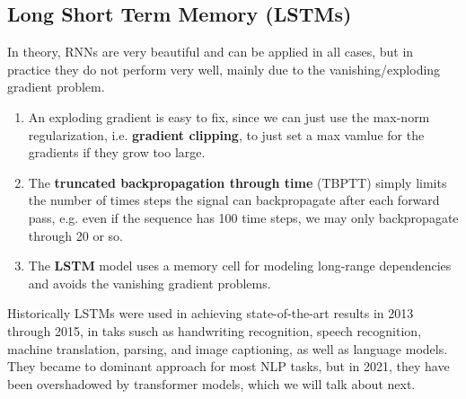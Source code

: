 \documentclass{article}
\begin{document}
  \subsection{Long Short Term Memory (LSTMs)}

    In theory, RNNs are very beautiful and can be applied in all cases, but in practice they do not perform very well, mainly due to the vanishing/exploding gradient problem. 
    \begin{enumerate}
        \item An exploding gradient is easy to fix, since we can just use the max-norm regularization, i.e. \textbf{gradient clipping}, to just set a max vamlue for the gradients if they grow too large. 
        \item The \textbf{truncated backpropagation through time} (TBPTT) simply limits the number of times steps the signal can backpropagate after each forward pass, e.g. even if the sequence has 100 time steps, we may only backpropagate through 20 or so. 
        \item The \textbf{LSTM} model uses a memory cell for modeling long-range dependencies and avoids the vanishing gradient problems. 
    \end{enumerate}
    Historically LSTMs were used in achieving state-of-the-art results in 2013 through 2015, in taks susch as handwriting recognition, speech recognition, machine translation, parsing, and image captioning, as well as language models. They became to dominant approach for most NLP tasks, but in 2021, they have been overshadowed by transformer models, which we will talk about next. 
\end{document}
